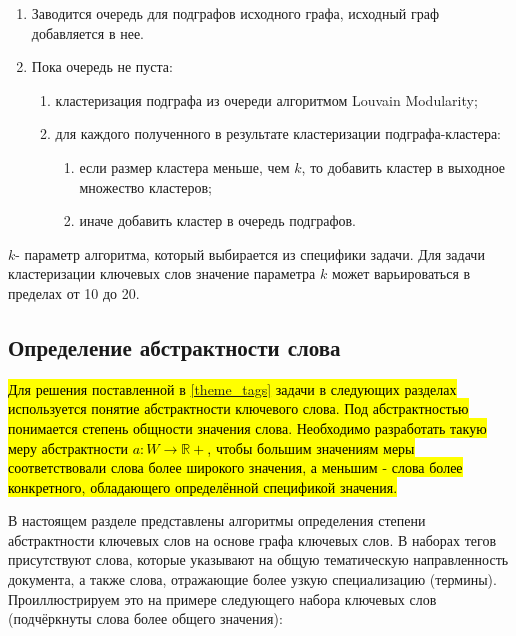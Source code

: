\begin{enumerate}
    \item Заводится очередь для подграфов исходного графа, исходный граф добавляется в нее.
    \item Пока очередь не пуста:
    \begin{enumerate}
        \item кластеризация подграфа из очереди алгоритмом Louvain Modularity;
        \item для каждого полученного в результате кластеризации подграфа-кластера:
            \begin{enumerate}
                \item если размер кластера меньше, чем $k$, то добавить кластер в выходное множество кластеров;
                \item иначе добавить кластер в очередь подграфов.
            \end{enumerate}
    \end{enumerate}
\end{enumerate}

$k$- параметр алгоритма, который выбирается из специфики задачи. Для задачи кластеризации ключевых слов значение параметра $k$ может варьироваться в пределах от 10 до 20.

\subsection{Определение абстрактности слова} \label{abstract_words_chapter}
\hl{Для решения поставленной в \ref{theme_tags} задачи в следующих разделах используется понятие абстрактности ключевого слова. Под абстрактностью понимается степень общности значения слова. Необходимо разработать такую меру абстрактности $a : W \rightarrow \mathbb{R}+$, чтобы большим значениям меры соответствовали слова более широкого значения, а меньшим - слова более конкретного, обладающего определённой спецификой значения.}

В настоящем разделе представлены алгоритмы определения степени абстрактности ключевых слов на основе графа ключевых слов. В наборах тегов присутствуют слова, которые
указывают на общую тематическую направленность документа, а также слова, отражающие более узкую специализацию (термины). Проиллюстрируем это на примере следующего набора ключевых слов (подчёркнуты слова более общего значения):

